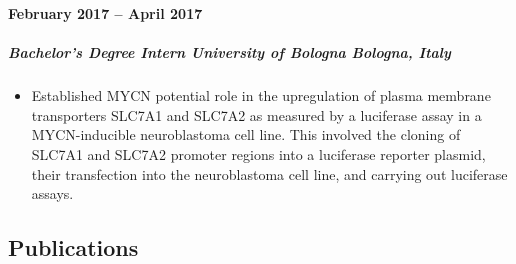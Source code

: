 \documentclass[
  letterpaper,
  DIV=11,
  numbers=noendperiod]{scrartcl}
\let\oldsubparagraph\subparagraph
\renewcommand{\subparagraph}[1]{\oldsubparagraph{#1}\mbox{}}
\providecommand{\tightlist}{%
  \setlength{\itemsep}{0pt}\setlength{\parskip}{0pt}}\usepackage{longtable,booktabs,array}
\begin{document}
\textbf{February 2017 -- April 2017}

\hypertarget{bachelors-degree-intern-university-of-bologna-bologna-italy}{%
\subparagraph{\texorpdfstring{\textbf{Bachelor's Degree Intern
\textbar{} University of Bologna \textbar{} Bologna,
Italy}}{Bachelor's Degree Intern \textbar{} University of Bologna \textbar{} Bologna, Italy}}\label{bachelors-degree-intern-university-of-bologna-bologna-italy}}

\begin{itemize}
\tightlist
\item
  Established MYCN potential role in the upregulation of plasma membrane
  transporters SLC7A1 and SLC7A2 as measured by a luciferase assay in a
  MYCN-inducible neuroblastoma cell line. This involved the cloning of
  SLC7A1 and SLC7A2 promoter regions into a luciferase reporter plasmid,
  their transfection into the neuroblastoma cell line, and carrying out
  luciferase assays.
\end{itemize}

\hypertarget{publications}{%
\subsection{Publications}\label{publications}}
\end{document}
